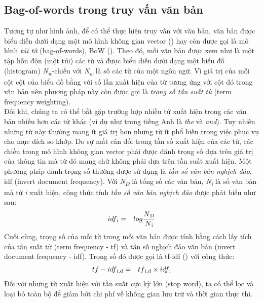 \subsection{Bag-of-words trong truy vấn văn bản}
Tương tự như hình ảnh, để có thể thực hiện truy vấn với văn bản, văn bản được biểu diễn dưới dạng một mô hình không gian vector (\cite{Salton:1986:IMI:576628}) hay còn được gọi là mô hình \textit{túi từ} (bag-of-words), BoW (\cite{manning2008introduction}). Theo đó, mỗi văn bản được xem như là một tập hỗn độn (một túi) các từ và được biểu diễn dưới dạng một biểu đồ (histogram) \textit{N\textsubscript{w}}-chiều với \textit{N\textsubscript{w}} là số các từ của một ngôn ngữ. Vì giá trị của mỗi cột cột của biểu đồ bằng với số lần xuất hiện của từ tương ứng với cột đó trong văn bản nên phương pháp này còn được gọi là \textit{trọng số tần suất từ} (term frequency weighting).\\
Đôi khi, chúng ta có thể bắt gặp trường hợp nhiều từ xuất hiện trong các văn bản nhiều hơn các từ khác (ví dụ như trong tiếng Anh là \textit{the} và \textit{and}). Tuy nhiên những từ này thường mang ít giá trị hơn những từ ít phổ biến trong việc phục vụ cho mục đích so khớp. Do sự mất cân đối trong tần số xuất hiện của các từ, các chiều trong mô hình không gian vector phải được đánh trọng số dựa trên giá trị của thông tin mà từ đó mang chứ không phải dựa trên tần suất xuất hiện. Một phương pháp đánh trọng số thường được sử dụng là \textit{tần số văn bản nghịch đảo}, idf (invert document frequency). Với \textit{N\textsubscript{D}} là tổng số các văn bản, \textit{N\textsubscript{i}} là số văn bản mà từ \textit{i} xuất hiện, công thức tính \textit{tần số văn bản nghịch đảo} được phát biểu như sau:
\begin{eqnarray}
 idf\textsubscript{i} &=& log \frac{N\textsubscript{D}}{N\textsubscript{i}}
\end{eqnarray}
Cuối cùng, trọng số của mỗi từ trong mỗi văn bản được tính bằng cách lấy tích của tần suất từ (term frequency - tf) và tần số nghịch đảo văn bản (invert document frequency - idf). Trọng số đó được gọi là tf-idf (\cite{manning2008introduction}) với công thức:
\begin{eqnarray}
 tf-idf\textsubscript{i,d} &=& tf\textsubscript{i,d} \times idf\textsubscript{i}
\end{eqnarray}
Đối với những từ xuất hiện với tần suất cực kỳ lớn (stop word), ta có thể lọc và loại bỏ toàn bộ để giảm bớt chi phí về không gian lưu trữ và thời gian thực thi.\\
